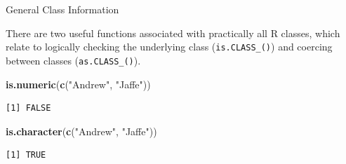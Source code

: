 \documentclass[
  ignorenonframetext,
]{beamer}
\newenvironment{Shaded}{\begin{snugshade}}{\end{snugshade}}
\newcommand{\KeywordTok}[1]{\textcolor[rgb]{0.13,0.29,0.53}{\textbf{#1}}}
\newcommand{\NormalTok}[1]{#1}
\newcommand{\StringTok}[1]{\textcolor[rgb]{0.31,0.60,0.02}{#1}}
\begin{document}
\begin{frame}[fragile]{General Class Information}
\protect\hypertarget{general-class-information}{}

There are two useful functions associated with practically all R
classes, which relate to logically checking the underlying class
(\texttt{is.CLASS\_()}) and coercing between classes
(\texttt{as.CLASS\_()}).

\begin{Shaded}
\begin{Highlighting}[]
\KeywordTok{is.numeric}\NormalTok{(}\KeywordTok{c}\NormalTok{(}\StringTok{"Andrew"}\NormalTok{, }\StringTok{"Jaffe"}\NormalTok{))}
\end{Highlighting}
\end{Shaded}

\begin{verbatim}
[1] FALSE
\end{verbatim}

\begin{Shaded}
\begin{Highlighting}[]
\KeywordTok{is.character}\NormalTok{(}\KeywordTok{c}\NormalTok{(}\StringTok{"Andrew"}\NormalTok{, }\StringTok{"Jaffe"}\NormalTok{))}
\end{Highlighting}
\end{Shaded}

\begin{verbatim}
[1] TRUE
\end{verbatim}

\end{frame}
\end{document}
